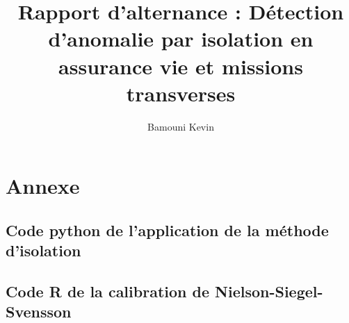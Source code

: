 \documentclass[12pt,a4paper]{report}
\author{Bamouni Kevin}
\title{Rapport d'alternance : Détection d'anomalie par isolation en assurance vie et missions transverses}
\begin{document}
\maketitle





\setcounter{page}{1} %







{\setlength{\baselineskip}{0.9\baselineskip}
\par}


\setcounter{page}{1} 









\chapter*{Annexe}

\section*{Code python de l'application de la méthode d'isolation}



\section*{Code R de la calibration de Nielson-Siegel-Svensson}



{\setlength{\baselineskip}{0.9\baselineskip}
\setcounter{tocdepth}{5} %
\tableofcontents %
\par}

\listoffigures

\listoftables



\cite{ManfredGilli2010}
\cite{Liu2012}
\cite{Hull2015}
\cite{STORN1997}
\cite{Befec-PriceWaterhouse1996}
\\
\end{document}
